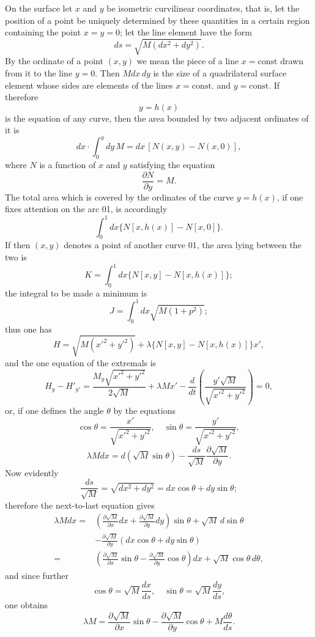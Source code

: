 \documentclass[11pt,a4paper,leqno]{article}
\begin{document}
On the surface let $x$ and $y$ be isometric curvilinear coordinates, that is, let the position of a point be uniquely determined by these quantities in a certain region containing the point $x=y=0$; let the line element have the form
\[
ds=\sqrt{M(dx^2+dy^2)}.
\]
By the ordinate of a point $(x,y)$ we mean the piece of a line $x=\mathrm{const}$ drawn from it to the line $y=0$. Then $Mdx\,dy$ is the size of a quadrilateral surface element whose sides are elements of the lines $x=\mathrm{const}.$ and $y=\mathrm{const}.$ If therefore
\[
y=h(x)
\]
is the equation of any curve, then the area bounded by two adjacent ordinates of it is
\[
dx\cdot\int_0^ydy\,M=dx\,[N(x,y)-N(x,0)],
\]
where $N$ is a function of $x$ and $y$ satisfying the equation
\[
\frac{\partial N}{\partial y}=M.
\]
The total area which is covered by the ordinates of the curve $y=h(x)$, if one fixes attention on the arc 01, is accordingly
\[
\int_0^1dx\{N[x,h(x)]-N[x,0]\}.
\]
If then $(x,y)$ denotes a point of another curve 01, the area lying between the two is
\[
K=\int_0^1dx\{N[x,y]-N[x,h(x)]\};
\]
the integral to be made a minimum is
\[
J=\int_0^1dx\sqrt{M(1+p^2)};
\]
thus one has
\[
H=\sqrt{M(x'^2+y'^2)}+\lambda\{N[x,y]-N[x,h(x)]\}x',
\]
and the one equation of the extremals is
\[
H_y-H'_{y'}=\frac{M_y\sqrt{x'^2+y'^2}}{2\sqrt{M}}+
\lambda Mx'-\frac{d}{dt}\left(\frac{y'\sqrt{M}}{\sqrt{x'^2+y'^2}}\right)=0,
\]
or, if one defines the angle $\theta$ by the equations
\[
\cos\theta=\frac{x'}{\sqrt{x'^2+y'^2}},
\quad
\sin\theta=\frac{y'}{\sqrt{x'^2+y'^2}},
\]
\[
\lambda Mdx=d(\sqrt{M}\sin\theta)-\frac{ds}{\sqrt{M}}\frac{\partial\sqrt{M}}{\partial y}.
\]
Now evidently
\[
\frac{ds}{\sqrt{M}}=\sqrt{dx^2+dy^2}=dx\cos\theta+dy\sin\theta;
\]
therefore the next-to-last equation gives
\[
\begin{aligned}
\lambda Mdx={}&\left(\frac{\partial\sqrt{M}}{\partial x}dx+\frac{\partial\sqrt{M}}{\partial y}dy\right)\sin\theta
+\sqrt{M}\,d\sin\theta\\
&-\frac{\partial\sqrt{M}}{\partial y}(dx\cos\theta+dy\sin\theta)\\
={}&\left(\frac{\partial\sqrt{M}}{\partial x}\sin\theta-\frac{\partial\sqrt{M}}{\partial y}\cos\theta\right)dx+
\sqrt{M}\cos\theta\,d\theta,
\end{aligned}
\]
and since further
\[
\cos\theta=\sqrt{M}\frac{dx}{ds},
\quad
\sin\theta=\sqrt{M}\frac{dy}{ds},
\]
one obtains
\[
\lambda M=\frac{\partial\sqrt{M}}{\partial x}\sin\theta-
\frac{\partial\sqrt{M}}{\partial y}\cos\theta+M\frac{d\theta}{ds}.
\]
\end{document}
